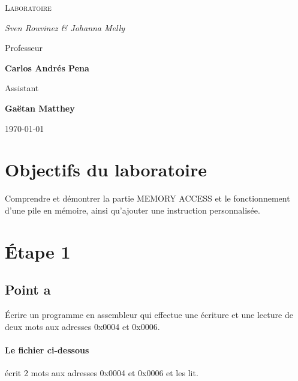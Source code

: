 \documentclass[a4paper]{article} %
\begin{document}
 

\begin{titlepage}
	\centering
	
	{\scshape\LARGE \color{Monokaimagenta} Laboratoire \\  \par}
	
	\vspace{1cm}
	
	{\Large\itshape Sven Rouvinez \& Johanna Melly\par}
	
	\vfill
	Professeur\par
	\textbf{Carlos Andrés Pena} \par%
	\vspace{1cm}
	Assistant\par
	\textbf{Gaëtan Matthey}
	
	\vfill

	{\large \today\par}
	
\end{titlepage}

\section{Objectifs du laboratoire}
Comprendre et démontrer la partie MEMORY ACCESS et le fonctionnement d'une pile en mémoire, ainsi qu'ajouter une instruction personnalisée.
\section{Étape 1}
\subsection{Point a}
Écrire un programme en assembleur qui effectue une écriture et une lecture de deux mots aux adresses 0x0004 et 0x0006.
\paragraph{Le fichier ci-dessous} écrit 2 mots aux adresses 0x0004 et 0x0006 et les lit.
\end{document}

